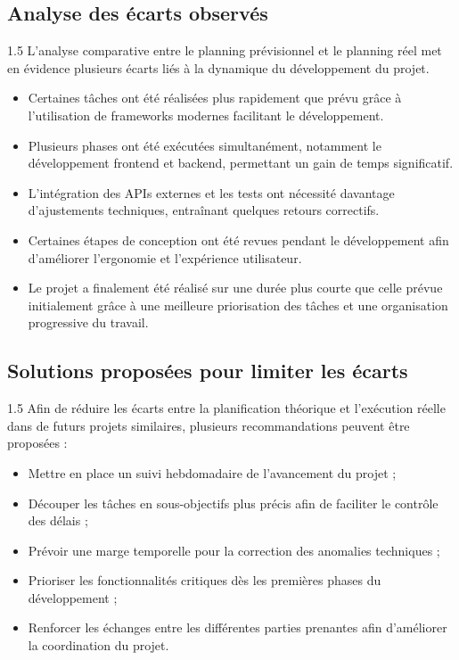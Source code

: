 \documentclass[a4paper,12pt]{report}
\begin{document}
\subsection{Analyse des écarts observés}
\vspace{0.5cm}
\begin{spacing}{1.5}
\justifying
L'analyse comparative entre le planning prévisionnel et le planning réel met en évidence plusieurs écarts liés à la dynamique du développement du projet.

\begin{itemize}
    \item Certaines tâches ont été réalisées plus rapidement que prévu grâce à l'utilisation de frameworks modernes facilitant le développement.
    \item Plusieurs phases ont été exécutées simultanément, notamment le développement frontend et backend, permettant un gain de temps significatif.
    \item L'intégration des APIs externes et les tests ont nécessité davantage d'ajustements techniques, entraînant quelques retours correctifs.
    \item Certaines étapes de conception ont été revues pendant le développement afin d'améliorer l'ergonomie et l'expérience utilisateur.
    \item Le projet a finalement été réalisé sur une durée plus courte que celle prévue initialement grâce à une meilleure priorisation des tâches et une organisation progressive du travail.
\end{itemize}
\end{spacing}

\subsection{Solutions proposées pour limiter les écarts}
\vspace{0.5cm}
\begin{spacing}{1.5}
\justifying
Afin de réduire les écarts entre la planification théorique et l'exécution réelle dans de futurs projets similaires, plusieurs recommandations peuvent être proposées :

\begin{itemize}
    \item Mettre en place un suivi hebdomadaire de l'avancement du projet ;
    \item Découper les tâches en sous-objectifs plus précis afin de faciliter le contrôle des délais ;
    \item Prévoir une marge temporelle pour la correction des anomalies techniques ;
    \item Prioriser les fonctionnalités critiques dès les premières phases du développement ;
    \item Renforcer les échanges entre les différentes parties prenantes afin d'améliorer la coordination du projet.
\end{itemize}

\end{spacing}
\end{document}
